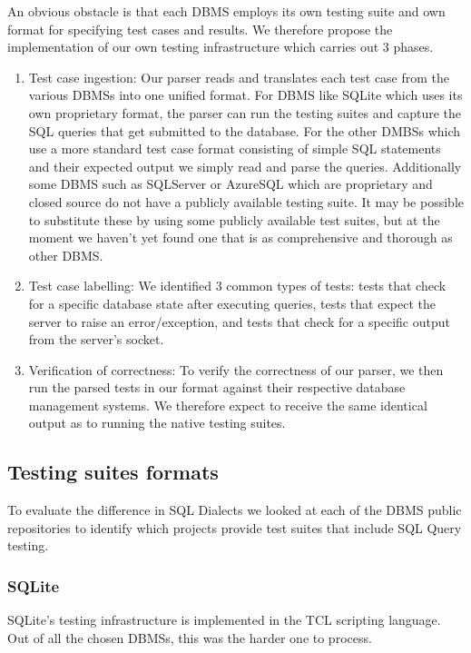 \documentclass[acmsmall,nonacm]{acmart}
\begin{document}
An obvious obstacle is that each DBMS employs its own testing suite and own format for specifying test cases and results. We therefore propose the implementation of our own testing infrastructure which carries out 3 phases.
\begin{enumerate}
\item Test case ingestion: Our parser reads and translates each test case from the various DBMSs into one unified format. For DBMS like SQLite which uses its own proprietary format, the parser can run the testing suites and capture the SQL queries that get submitted to the database. For the other DMBSs which use a more standard test case format consisting of simple SQL statements and their expected output we simply read and parse the queries. Additionally some DBMS such as SQLServer or AzureSQL which are proprietary and closed source do not have a publicly available testing suite. It may be possible to substitute these by using some publicly available test suites, but at the moment we haven't yet found one that is as comprehensive and thorough as other DBMS.
\item Test case labelling: We identified 3 common types of tests: tests that check for a specific database state after executing queries, tests that expect the server to raise an error/exception, and tests that check for a specific output from the server's socket.
\item Verification of correctness: To verify the correctness of our parser, we then run the parsed tests in our format against their respective database management systems. We therefore expect to receive the same identical output as to running the native testing suites.
\end{enumerate}


\subsection{Testing suites formats}

To evaluate the difference in SQL Dialects we looked at each of the DBMS public repositories to identify which projects provide test suites that include SQL Query testing. 

\subsubsection{SQLite}

SQLite's testing infrastructure is implemented in the TCL scripting language. Out of all the chosen DBMSs, this was the harder one to process.
\end{document}
